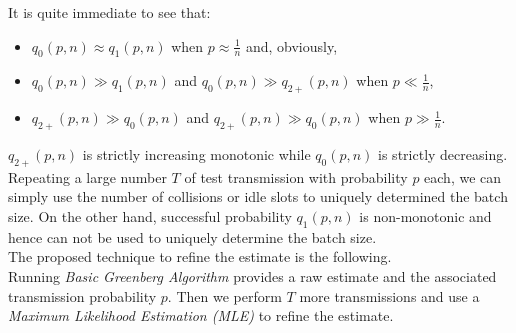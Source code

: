\documentclass[11pt,a4paper,twoside,openright]{book}
\begin{document}
It is quite immediate to see that:
\begin{itemize}
\item $q_{0}(p,n) \approx q_{1}(p,n)$ when $p\approx {\displaystyle\frac{1}{n}}$ and, obviously,
\item $q_{0}(p,n) \gg q_{1}(p,n)$ and $q_{0}(p,n) \gg q_{2+}(p,n)$ when $p \ll {\displaystyle\frac{1}{n}}$,
\item $q_{2+}(p,n) \gg q_{0}(p,n)$ and $q_{2+}(p,n) \gg q_{0}(p,n)$ when $p \gg {\displaystyle\frac{1}{n}}$.
\end{itemize}
$q_{2+}(p,n)$ is strictly increasing monotonic while $q_{0}(p,n)$ is strictly decreasing. Repeating a large number $T$ of test transmission with  probability $p$ each, we can simply use the number of collisions or idle slots to uniquely determined the batch size. On the other hand, successful probability $q_{1}(p,n)$ is non-monotonic and hence can not be used to uniquely determine the batch size.\\
 
 The proposed technique to refine the estimate is the following.\\
 Running \emph{Basic Greenberg Algorithm} provides a raw estimate and the associated transmission probability $p$. Then we perform $T$ more transmissions and use a \emph{Maximum Likelihood Estimation (MLE)} to refine the estimate.\\ 
 
\end{document}
